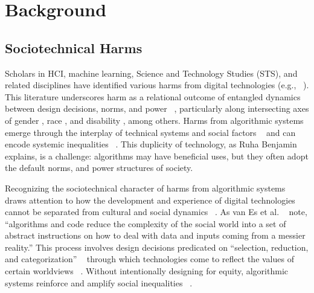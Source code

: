 \section{Background}
\label{background}
\subsection{Sociotechnical Harms} 
Scholars in HCI, machine learning, Science and Technology Studies (STS), and related disciplines have identified various harms from digital technologies (e.g., ~\cite{Angwin_Larson_Mattu_Kirchner_2016, Katzman_Barocas_Blodgett_Laird_Scheuerman_Wallach_2021, Scheuerman_Branham_Hamidi_2018, Scheuerman_Jiang_Fiesler_Brubaker_2021, Smuha_2021b}). This literature underscores harm as a relational outcome of entangled dynamics between design decisions, norms, and power ~\cite{Andalibi_Garcia_2021, Benjamin_2019, DeVito_Walker_Fernandez_2021, Mohamed_Png_Isaac_2020, West_2020}, particularly along intersecting axes of gender \cite{Bivens_Haimson_2016, shelby2021}, race \cite{Noble_2018, henne2021}, and disability \cite{bennett2020, Bennett_Gleason_Scheuerman_Bigham_Guo_To_2021}, among others. Harms from algorithmic systems emerge through the interplay of technical systems and social factors ~\cite{Blodgett_Barocas_Daume_Wallach_2020, Friedman_Nissenbaum_1996} and can encode systemic inequalities ~\cite{Sweeney_2013, May_Wang_Bordia_Bowman_Rudinger_2019, mengesha2021don, blodgett2022responsible}. This duplicity of technology, as Ruha Benjamin ~\cite{Benjamin_2019} explains, is a challenge: algorithms may have beneficial uses, but they often adopt the default norms, and power structures of society.

Recognizing the sociotechnical character of harms from algorithmic systems draws attention to how the development and experience of digital technologies cannot be separated from cultural and social dynamics ~\cite{Alkhatib2021, costanza2020design, qadri2023, prabhakaran2022cultural}. As van Es et al. ~\cite[n.p.]{vanEs_2021} note, “algorithms and code reduce the complexity of the social world into a set of abstract instructions on how to deal with data and inputs coming from a messier reality.” This process involves design decisions predicated on “selection, reduction, and categorization” ~\cite{Bowker_Star_2000} through which technologies come to reflect the values of certain worldviews ~\cite{Bowker_Star_2000, Suresh_Guttag_2021}. Without intentionally designing for equity, algorithmic systems reinforce and amplify social inequalities ~\cite{costanza2020design}.

